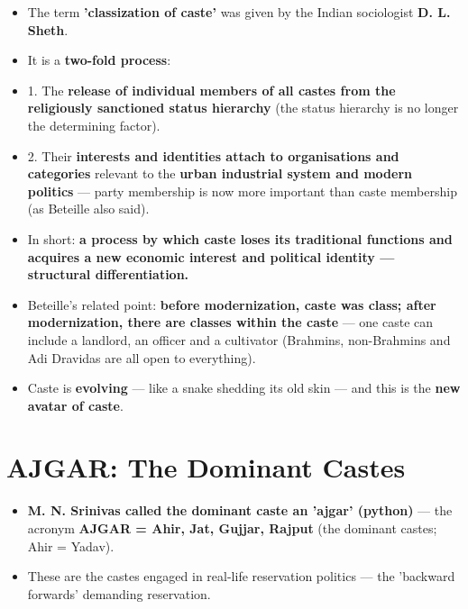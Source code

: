 \begin{KeyConcept}
\begin{itemize}
\item The term \textbf{'classization of caste'} was given by the Indian sociologist \textbf{D. L. Sheth}.
\item It is a \textbf{two-fold process}:
\item 1. The \textbf{release of individual members of all castes from the religiously sanctioned status hierarchy} (the status hierarchy is no longer the determining factor).
\item 2. Their \textbf{interests and identities attach to organisations and categories} relevant to the \textbf{urban industrial system and modern politics} --- party membership is now more important than caste membership (as Beteille also said).
\item In short: \textbf{a process by which caste loses its traditional functions and acquires a new economic interest and political identity --- structural differentiation.}
\end{itemize}
\end{KeyConcept}

\begin{KeyConcept}
\begin{itemize}
\item Beteille's related point: \textbf{before modernization, caste was class; after modernization, there are classes within the caste} --- one caste can include a landlord, an officer and a cultivator (Brahmins, non-Brahmins and Adi Dravidas are all open to everything).
\item Caste is \textbf{evolving} --- like a snake shedding its old skin --- and this is the \textbf{new avatar of caste}.
\end{itemize}
\end{KeyConcept}

\section{AJGAR: The Dominant Castes}

\begin{KeyConcept}
\begin{itemize}
\item \textbf{M. N. Srinivas called the dominant caste an 'ajgar' (python)} --- the acronym \textbf{AJGAR = Ahir, Jat, Gujjar, Rajput} (the dominant castes; Ahir = Yadav).
\item These are the castes engaged in real-life reservation politics --- the 'backward forwards' demanding reservation.
\end{itemize}
\end{KeyConcept}

